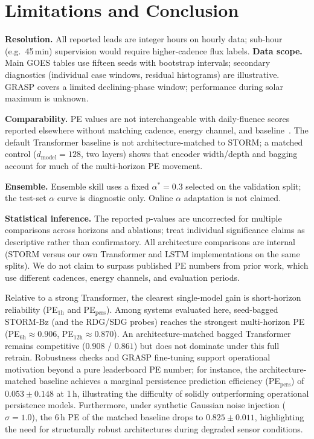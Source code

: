 \documentclass[conference]{IEEEtran}
\begin{document}
\section{Limitations and Conclusion}
\textbf{Resolution.} All reported leads are integer hours on hourly data; sub-hour (e.g.\ 45\,min) supervision would require higher-cadence flux labels.
\textbf{Data scope.} Main GOES tables use fifteen seeds with bootstrap intervals; secondary diagnostics (individual case windows, residual histograms) are illustrative. GRASP covers a limited declining-phase window; performance during solar maximum is unknown.

\textbf{Comparability.} PE values are not interchangeable with daily-fluence scores reported elsewhere without matching cadence, energy channel, and baseline~\cite{b11,b12}. The default Transformer baseline is not architecture-matched to STORM; a matched control ($d_{\mathrm{model}}=128$, two layers) shows that encoder width/depth and bagging account for much of the multi-horizon PE movement.

\textbf{Ensemble.} Ensemble skill uses a fixed \(\alpha^*=0.3\) selected on the validation split; the test-set \(\alpha\) curve is diagnostic only. Online \(\alpha\) adaptation is not claimed.

\textbf{Statistical inference.} The reported p-values are uncorrected for multiple comparisons across horizons and ablations; treat individual significance claims as descriptive rather than confirmatory. All architecture comparisons are internal (STORM versus our own Transformer and LSTM implementations on the same splits). We do not claim to surpass published PE numbers from prior work, which use different cadences, energy channels, and evaluation periods.

Relative to a strong Transformer, the clearest single-model gain is short-horizon
reliability (PE$_{1\mathrm{h}}$ and PE$_{\mathrm{pers}}$).
Among systems evaluated here, seed-bagged STORM-Bz (and the RDG/SDG probes)
reaches the strongest multi-horizon PE
(PE$_{6\mathrm{h}}\approx0.906$, PE$_{12\mathrm{h}}\approx0.870$).
An architecture-matched bagged Transformer remains competitive
($0.908$ / $0.861$) but does not dominate under this full retrain.
Robustness checks and GRASP fine-tuning support operational motivation beyond a pure leaderboard PE number; for instance, the architecture-matched baseline achieves a marginal persistence prediction efficiency (PE\(_{\mathrm{pers}}\)) of \(0.053 \pm 0.148\) at 1\,h, illustrating the difficulty of solidly outperforming operational persistence models. Furthermore, under synthetic Gaussian noise injection (\(\sigma=1.0\)), the 6\,h PE of the matched baseline drops to \(0.825 \pm 0.011\), highlighting the need for structurally robust architectures during degraded sensor conditions.
\end{document}
